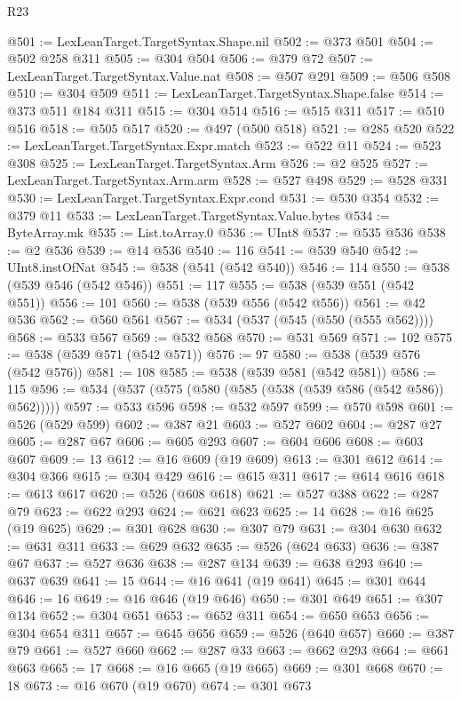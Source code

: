 \begin{lexlean}{R23}
\begin{coremodule}
@501 := LexLeanTarget.TargetSyntax.Shape.nil
@502 := @373 @501
@504 := @502 @258 @311
@505 := @304 @504
@506 := @379 @72
@507 := LexLeanTarget.TargetSyntax.Value.nat
@508 := @507 @291
@509 := @506 @508
@510 := @304 @509
@511 := LexLeanTarget.TargetSyntax.Shape.false
@514 := @373 @511 @184 @311
@515 := @304 @514
@516 := @515 @311
@517 := @510 @516
@518 := @505 @517
@520 := @497 (@500 @518)
@521 := @285 @520
@522 := LexLeanTarget.TargetSyntax.Expr.match
@523 := @522 @11
@524 := @523 @308
@525 := LexLeanTarget.TargetSyntax.Arm
@526 := @2 @525
@527 := LexLeanTarget.TargetSyntax.Arm.arm
@528 := @527 @498
@529 := @528 @331
@530 := LexLeanTarget.TargetSyntax.Expr.cond
@531 := @530 @354
@532 := @379 @11
@533 := LexLeanTarget.TargetSyntax.Value.bytes
@534 := ByteArray.mk
@535 := List.toArray.{0}
@536 := UInt8
@537 := @535 @536
@538 := @2 @536
@539 := @14 @536
@540 := 116
@541 := @539 @540
@542 := UInt8.instOfNat
@545 := @538 (@541 (@542 @540))
@546 := 114
@550 := @538 (@539 @546 (@542 @546))
@551 := 117
@555 := @538 (@539 @551 (@542 @551))
@556 := 101
@560 := @538 (@539 @556 (@542 @556))
@561 := @42 @536
@562 := @560 @561
@567 := @534 (@537 (@545 (@550 (@555 @562))))
@568 := @533 @567
@569 := @532 @568
@570 := @531 @569
@571 := 102
@575 := @538 (@539 @571 (@542 @571))
@576 := 97
@580 := @538 (@539 @576 (@542 @576))
@581 := 108
@585 := @538 (@539 @581 (@542 @581))
@586 := 115
@596 := @534 (@537 (@575 (@580 (@585 (@538 (@539 @586 (@542 @586)) @562)))))
@597 := @533 @596
@598 := @532 @597
@599 := @570 @598
@601 := @526 (@529 @599)
@602 := @387 @21
@603 := @527 @602
@604 := @287 @27
@605 := @287 @67
@606 := @605 @293
@607 := @604 @606
@608 := @603 @607
@609 := 13
@612 := @16 @609 (@19 @609)
@613 := @301 @612
@614 := @304 @366
@615 := @304 @429
@616 := @615 @311
@617 := @614 @616
@618 := @613 @617
@620 := @526 (@608 @618)
@621 := @527 @388
@622 := @287 @79
@623 := @622 @293
@624 := @621 @623
@625 := 14
@628 := @16 @625 (@19 @625)
@629 := @301 @628
@630 := @307 @79
@631 := @304 @630
@632 := @631 @311
@633 := @629 @632
@635 := @526 (@624 @633)
@636 := @387 @67
@637 := @527 @636
@638 := @287 @134
@639 := @638 @293
@640 := @637 @639
@641 := 15
@644 := @16 @641 (@19 @641)
@645 := @301 @644
@646 := 16
@649 := @16 @646 (@19 @646)
@650 := @301 @649
@651 := @307 @134
@652 := @304 @651
@653 := @652 @311
@654 := @650 @653
@656 := @304 @654 @311
@657 := @645 @656
@659 := @526 (@640 @657)
@660 := @387 @79
@661 := @527 @660
@662 := @287 @33
@663 := @662 @293
@664 := @661 @663
@665 := 17
@668 := @16 @665 (@19 @665)
@669 := @301 @668
@670 := 18
@673 := @16 @670 (@19 @670)
@674 := @301 @673

\end{coremodule}
\end{lexlean}

